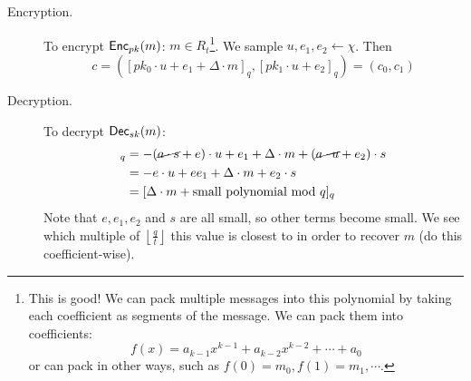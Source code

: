 \begin{description}
    \item[Encryption.] To encrypt $\operatorname{\mathsf{Enc}}_{pk}(m)$: $m\in R_t$\footnote{This is good! We can pack multiple messages into this polynomial by taking each coefficient as segments of the message. We can pack them into coefficients:
        \[f(x) = a_{k-1}x^{k-1} + a_{k-2}x^{k-2}+ \cdots + a_0\]
        or can pack in other ways, such as $f(0) = m_0, f(1) = m_1, \cdots$. }. We sample $u, e_1, e_2\leftarrow \chi$. Then
        \[c = \left( [pk_0\cdot u + e_1 + \Delta\cdot m]_q , [pk_1\cdot u + e_2]_q\right) = (c_0, c_1)\]
    \item[Decryption.] To decrypt $\operatorname{\mathsf{Dec}}_{sk}(m)$:
        \begin{align*}
            [c_0 + c_1\cdot s]_q & = -(\cancel{a\cdot s} + e) \cdot u + e_1 + \Delta\cdot m + (\cancel{a\cdot u} + e_2)\cdot s \\
                                 & = -e\cdot u + ee_1 + \Delta\cdot m + e_2\cdot s                                             \\
                                 & = [\Delta \cdot m + \text{small polynomial mod $q$}]_q
        \end{align*}
        Note that $e, e_1, e_2$ and $s$ are all small, so other terms become small. We see which multiple of $\left\lfloor \frac{q}{t}\right\rfloor$ this value is closest to in order to recover $m$ (do this coefficient-wise).


\end{description}
